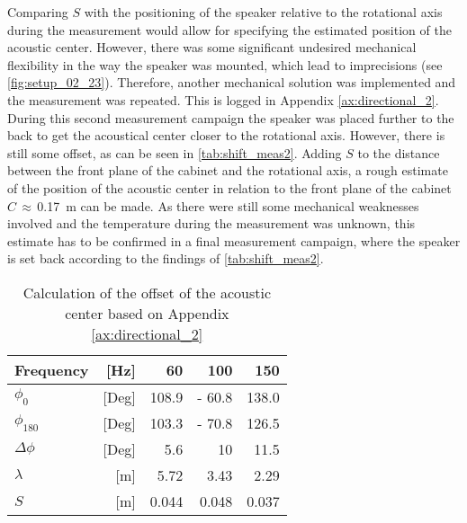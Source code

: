 Comparing \(S\) with the positioning of the speaker relative to the rotational axis during the measurement would allow for specifying the estimated position of the acoustic center. However, there was some significant undesired mechanical flexibility in the way the speaker was mounted, which lead to imprecisions (see \autoref{fig:setup_02_23}). Therefore, another mechanical solution was implemented and the measurement was repeated. This is  logged in Appendix \ref{ax:directional_2}.
During this second measurement campaign the speaker was placed further to the back to get the acoustical center closer to the rotational axis. However, there is still some offset, as can be seen in \autoref{tab:shift_meas2}.
Adding \(S\) to the distance between the front plane of the cabinet and the rotational axis, a rough estimate of the position of the acoustic center in relation to the front plane of the cabinet \(C\,\approx\,\)\SI{0.17}{\meter} can be made. As there were still some mechanical weaknesses involved and the temperature during the measurement was unknown, this estimate has to be confirmed in a final measurement campaign, where the speaker is set back according to the findings of \autoref{tab:shift_meas2}.\\
\begin{table}[H]
\centering
\caption{Calculation of the offset of the acoustic center based on Appendix \ref{ax:directional_2}}
\label{tab:shift_meas2}
\begin{tabular}{|lr|r|r|r|}
\hline
Frequency              & {[}Hz{]}  & 60    & 100    & 150   \\ \hline
\(\phi_0\)             & {[}Deg{]} & 108.9 & - 60.8 & 138.0 \\ \hline
\(\phi_{180}\)         & {[}Deg{]} & 103.3 & - 70.8 & 126.5 \\ \hline
\(\Delta\phi\)         & {[}Deg{]} & 5.6   & 10     & 11.5  \\ \hline
\(\lambda\)            & {[}m{]}   & 5.72  & 3.43   & 2.29  \\ \hline
\(S\)                  & {[}m{]}   & 0.044 & 0.048  & 0.037 \\ \hline
\end{tabular}
\end{table}

